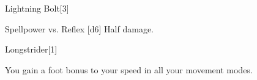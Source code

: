 \begin{spellsection}{Lightning Bolt}[3]
    \begin{spellheader}
    \end{spellheader}
    \begin{spellcontent}
        \begin{spelltargetinginfo}
        \end{spelltargetinginfo}
        \begin{spelleffects}
            \begin{spellattack}{Spellpower vs. Reflex}
                \spellsuccess {}[d6]
                \spellfailure Half damage.
            \end{spellattack}
        \end{spelleffects}
    \end{spellcontent}
    \begin{spellfooter}
        \spellnotes \destructivespellnotes
        \miscastexplode
    \end{spellfooter}
\end{spellsection}

\begin{spellsection}{Longstrider}[1]
    \begin{spellheader}
    \end{spellheader}
    \begin{spellcontent}
        \begin{spelltargetinginfo}
        \end{spelltargetinginfo}
        \begin{spelleffects}
            \spelleffect You gain a  foot bonus to your speed in all your movement modes.
            \spelldur \durlong \dismissable
        \end{spelleffects}
    \end{spellcontent}
    \begin{spellfooter}
        \miscastexplode
    \end{spellfooter}
\end{spellsection}


